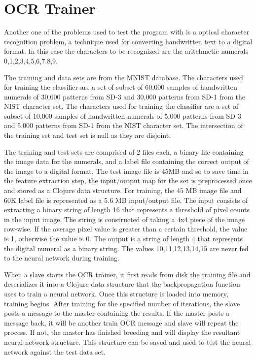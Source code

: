 \chapter[OCR Trainer]{OCR Trainer}
Another one of the problems used to test the program with is a optical character recognition problem, a technique used for converting handwritten text to a digital format. In this case the characters to be recognized are the aritchmetic numerals 0,1,2,3,4,5,6,7,8,9.

The training and data sets are from the MNIST database\cite{mnist}.
The characters used for training the classifier are a set of subset of 60,000 samples of handwritten numerals of 30,000 patterns from SD-3 and 30,000 patterns from SD-1 from the NIST character set. 
The characters used for training the classifier are a set of subset of 10,000 samples of handwritten numerals of 5,000 patterns from SD-3 and 5,000 patterns from SD-1 from the NIST character set. 
The intersection of the training set and test set is null as they are disjoint.

The training and test sets are comprised of 2 files each, a binary file containing the image data for the numerals, and a label file containing the correct output of the image to a digital format. 
The test image file is 45MB and so to save time in the feature extraction step, the input/output map for the set is preprocessed once and stored as a Clojure data structure. 
For training, the 45 MB image file and 60K label file is represented as a 5.6 MB input/output file. 
The input consists of extracting a binary string of length 16 that represents a threshold of pixel counts in the input image. 
The string is constructed of taking a 4x4 piece of the image row-wise. 
If the average pixel value is greater than a certain threshold, the value is 1, otherwise the value is 0. 
The output is a string of length 4 that represents the digital numeral as a binary string. 
The values 10,11,12,13,14,15 are never fed to the neural network during training.

When a slave starts the OCR trainer, it first reads from disk the training file and deserializes it into a Clojure data structure that the backpropagation function uses to train a neural network. 
Once this structure is loaded into memory, training begins. 
After training for the specified number of iterations, the slave posts a message to the master containing the results. 
If the master posts a message back, it will be another train OCR message and slave will repeat the process. 
If not, the master has finished breeding and will display the resultant neural network structure. 
This structure can be saved and used to test the neural network against the test data set.

